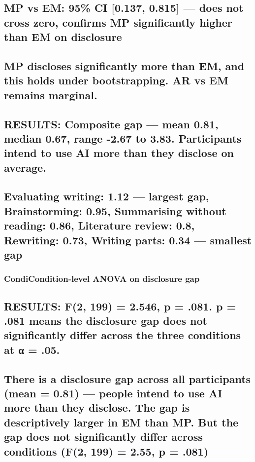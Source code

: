 \documentclass[
]{article}
\begin{document}
\subsection{MP vs EM: 95\% CI {[}0.137, 0.815{]} --- does not cross
zero, confirms MP significantly higher than EM on
disclosure}\label{mp-vs-em-95-ci-0.137-0.815-does-not-cross-zero-confirms-mp-significantly-higher-than-em-on-disclosure}

\subsection{MP discloses significantly more than EM, and this holds
under bootstrapping. AR vs EM remains
marginal.}\label{mp-discloses-significantly-more-than-em-and-this-holds-under-bootstrapping.-ar-vs-em-remains-marginal.}

\subsection{RESULTS: Composite gap --- mean 0.81, median 0.67, range
-2.67 to 3.83. Participants intend to use AI more than they disclose on
average.}\label{results-composite-gap-mean-0.81-median-0.67-range--2.67-to-3.83.-participants-intend-to-use-ai-more-than-they-disclose-on-average.}

\subsection{Evaluating writing: 1.12 --- largest gap, Brainstorming:
0.95, Summarising without reading: 0.86, Literature review: 0.8,
Rewriting: 0.73, Writing parts: 0.34 --- smallest
gap}\label{evaluating-writing-1.12-largest-gap-brainstorming-0.95-summarising-without-reading-0.86-literature-review-0.8-rewriting-0.73-writing-parts-0.34-smallest-gap}

\subsubsection{CondiCondition-level ANOVA on disclosure
gap}\label{condicondition-level-anova-on-disclosure-gap}

\subsection{RESULTS: F(2, 199) = 2.546, p = .081. p = .081 means the
disclosure gap does not significantly differ across the three conditions
at α =
.05.}\label{results-f2-199-2.546-p-.081.-p-.081-means-the-disclosure-gap-does-not-significantly-differ-across-the-three-conditions-at-ux3b1-.05.}

\subsection{There is a disclosure gap across all participants (mean =
0.81) --- people intend to use AI more than they disclose. The gap is
descriptively larger in EM than MP. But the gap does not significantly
differ across conditions (F(2, 199) = 2.55, p =
.081)}\label{there-is-a-disclosure-gap-across-all-participants-mean-0.81-people-intend-to-use-ai-more-than-they-disclose.-the-gap-is-descriptively-larger-in-em-than-mp.-but-the-gap-does-not-significantly-differ-across-conditions-f2-199-2.55-p-.081}
\end{document}
